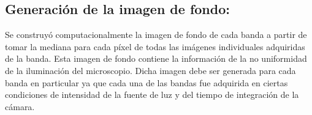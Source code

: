 \subsection{Generación de la imagen de fondo: \href{https://github.com/jrr1984/defects_analysis/blob/master/bg.py}{\faGithub}}
\label{sec:genimf}

\hspace{0.5cm}Se construyó computacionalmente la imagen de fondo de cada banda a partir de tomar la mediana para cada píxel de todas las imágenes individuales adquiridas de la banda. Esta imagen de fondo contiene la información de la no uniformidad de la iluminación del microscopio. Dicha imagen debe ser generada para cada banda en particular ya que cada una de las bandas fue adquirida en ciertas condiciones de intensidad de la fuente de luz y del tiempo de integración de la cámara. 

